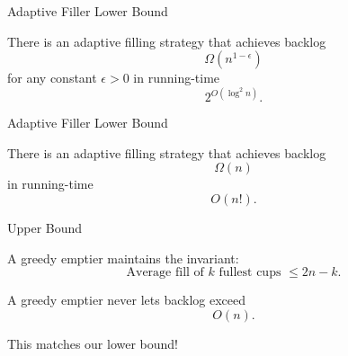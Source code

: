 \documentclass[xcolor=x11names, svgnames, rgb]{beamer}
\begin{document}
\begin{frame}[t]{Adaptive Filler Lower Bound}
  \begin{theorem}
    There is an adaptive filling strategy that achieves
    backlog $$\Omega(n^{1-\epsilon})$$ for any constant $\epsilon >0$ in running-time $$2^{O(\log^2 n)}.$$
  \end{theorem}
\end{frame}
\begin{frame}[t]{Adaptive Filler Lower Bound}
  \begin{theorem}
    There is an adaptive filling strategy that achieves backlog $$\Omega(n)$$ in running-time $$O(n!).$$
  \end{theorem}
\end{frame}
\begin{frame}[t]{Upper Bound}
  \begin{theorem}
    A greedy emptier maintains the invariant: 
    $$\text{Average fill of $k$ fullest cups } \le 2n-k.$$
  \end{theorem}

  \begin{corollary}
  A greedy emptier never lets backlog exceed $$O(n).$$
  \end{corollary}

  \vspace{0.3cm}
  This matches our lower bound!
\end{frame}
\end{document}
